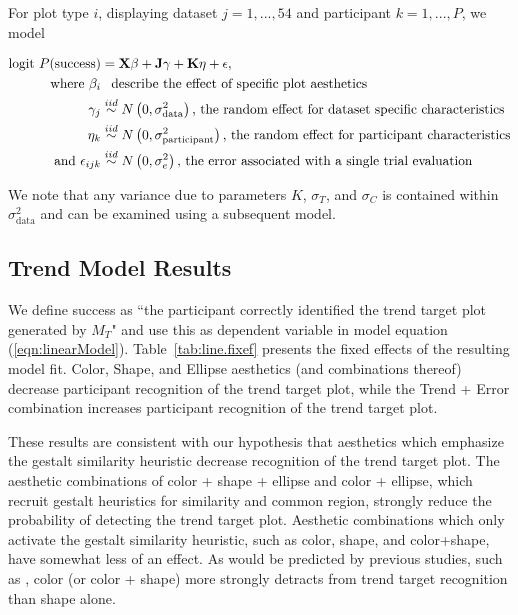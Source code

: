 \documentclass[12pt]{article}\usepackage[]{graphicx}\usepackage[]{color}
\begin{document}
\begin{appendix}
For plot type $i$, displaying dataset $j=1, ..., 54$ and participant $k=1, ..., P$, we model

\begin{align}
\text{logit }P(\text{success}) & =  \textbf{X}\beta + \textbf{J}\gamma + \textbf{K}\eta + \epsilon, \label{eqn:linearModel}\\
\text{where } \beta_i & \hphantom{\sim} \text{describe the effect of specific plot aesthetics}\nonumber\\
\hphantom{where } \gamma_j & \overset{iid}{\sim} N\left(0, \sigma^2_{\text{data}}\right)\text{, the random effect for dataset specific characteristics}\nonumber\\
\hphantom{where } \eta_k & \overset{iid}{\sim} N\left(0, \sigma^2_{\text{participant}}\right)\text{, the random effect for participant characteristics}\nonumber\\
\text{and } \epsilon_{ijk} & \overset{iid}{\sim}  N\left(0, \sigma^2_e\right)\text{, the error associated with a single trial evaluation} \nonumber
\end{align}

We note that any variance due to parameters $K$, $\sigma_T$, and $\sigma_C$ is contained within $\sigma^2_{\text{data}}$ and can be examined using a subsequent model. 
\subsection{Trend Model Results}\label{app:trendmodel}
We define success as ``the participant correctly identified the trend target plot generated by $M_T$" and use this as dependent variable in model equation (\ref{eqn:linearModel}).  Table~\ref{tab:line.fixef} presents the fixed effects of the resulting model fit. Color, Shape, and Ellipse aesthetics (and combinations thereof) decrease participant recognition of the trend target plot, while the Trend + Error combination increases participant recognition of the trend target plot.



These results are consistent with our hypothesis that aesthetics which emphasize the gestalt similarity heuristic decrease recognition of the trend target plot. The aesthetic combinations of color + shape + ellipse and color + ellipse, which recruit gestalt heuristics for similarity and common region, strongly reduce the probability of detecting the trend target plot. Aesthetic combinations which only activate the gestalt similarity heuristic, such as color, shape, and color+shape, have somewhat less of an effect. As would be predicted by previous studies, such as \citet{lewandowsky1989discriminating}, color (or color + shape) more strongly detracts from trend target recognition than shape alone. 


\end{appendix}
\end{document}
